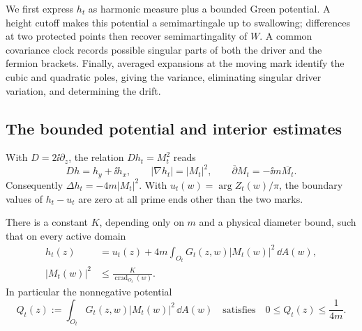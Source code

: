 We first express $h_t$ as harmonic measure plus a bounded Green
potential. A height cutoff makes this potential a semimartingale up to
swallowing; differences at two protected points then recover
semimartingality of $W$. A common covariance clock records possible
singular parts of both the driver and the fermion brackets. Finally,
averaged expansions at the moving mark identify the cubic and quadratic
poles, giving the variance, eliminating singular driver variation, and
determining the drift.

\subsection{The bounded potential and interior estimates}
\label{cal:deterministic}

With $D=2\ii\partial_z$, the relation $Dh_t=M_t^2$ reads
\[
 Dh=h_y+\ii h_x,
 \qquad |\nabla h_t|=|M_t|^2,
 \qquad \overline\partial M_t=-\ii m\overline{M_t}.
\]
Consequently $\Delta h_t=-4m|M_t|^2$.  With
$u_t(w)=\arg Z_t(w)/\pi$, the boundary values of $h_t-u_t$ are zero at
all prime ends other than the two marks.

\begin{lemma}
\label{cal:potential}
There is a constant $K$, depending only on $m$ and a physical diameter
bound, such that on every active domain
\begin{align}
 h_t(z)&=u_t(z)+4m\int_{O_t}G_t(z,w)|M_t(w)|^2\,\dd A(w),
 \label{cal:representation}\\
 |M_t(w)|^2&\leq \frac{K}{\operatorname{crad}_{O_t}(w)}.
 \label{cal:bulk-bound}
\end{align}
In particular the nonnegative potential
\begin{equation}
 Q_t(z):=\int_{O_t}G_t(z,w)|M_t(w)|^2\,\dd A(w)
 \quad\text{satisfies}\quad 0\leq Q_t(z)\leq\frac1{4m}.
 \label{cal:bounded-potential}
\end{equation}
\end{lemma}

